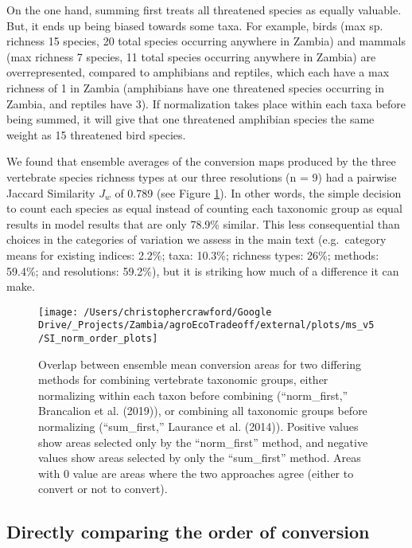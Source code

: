 \documentclass[
]{article}
\begin{document}
On the one hand, summing first treats all threatened species as equally valuable. But, it ends up being biased towards some taxa. For example, birds (max sp. richness 15 species, 20 total species occurring anywhere in Zambia) and mammals (max richness 7 species, 11 total species occurring anywhere in Zambia) are overrepresented, compared to amphibians and reptiles, which each have a max richness of 1 in Zambia (amphibians have one threatened species occurring in Zambia, and reptiles have 3). If normalization takes place within each taxa before being summed, it will give that one threatened amphibian species the same weight as 15 threatened bird species.

We found that ensemble averages of the conversion maps produced by the three vertebrate species richness types at our three resolutions (n = 9) had a pairwise Jaccard Similarity \(J_w\) of 0.789 (see Figure \ref{fig:norm-order}). In other words, the simple decision to count each species as equal instead of counting each taxonomic group as equal results in model results that are only 78.9\% similar. This less consequential than choices in the categories of variation we assess in the main text (e.g.~category means for existing indices: 2.2\%; taxa: 10.3\%; richness types: 26\%; methods: 59.4\%; and resolutions: 59.2\%), but it is striking how much of a difference it can make.



\begin{figure}

{\centering \texttt{[image: /Users/christophercrawford/Google Drive/\_Projects/Zambia/agroEcoTradeoff/external/plots/ms\_v5/SI\_norm\_order\_plots]} 

}

\caption{Overlap between ensemble mean conversion areas for two differing methods for combining vertebrate taxonomic groups, either normalizing within each taxon before combining (``norm\_first,'' Brancalion et al. (2019)), or combining all taxonomic groups before normalizing (``sum\_first,'' Laurance et al. (2014)). Positive values show areas selected only by the ``norm\_first'' method, and negative values show areas selected by only the ``sum\_first'' method. Areas with 0 value are areas where the two approaches agree (either to convert or not to convert).}\label{fig:norm-order}
\end{figure}

\newpage

\hypertarget{section-order}{%
\subsection{Directly comparing the order of conversion}\label{section-order}}
\end{document}

